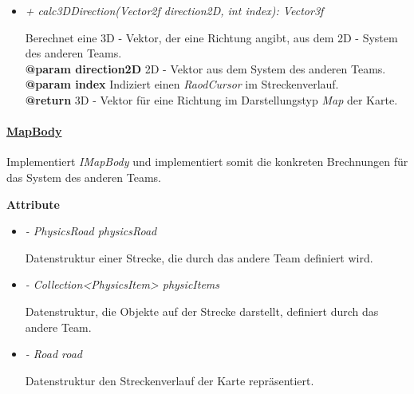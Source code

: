 \begin{itemize}
                    \item  \textit{+ calc3DDirection(Vector2f direction2D, int index): Vector3f}
                    \begin{leftbar}[0.9\linewidth]
                        Berechnet eine 3D - Vektor, der eine Richtung angibt, aus dem 2D - System des anderen Teams.\\
                        \textbf{@param direction2D} 2D - Vektor aus dem System des anderen Teams.\\
                        \textbf{@param index} Indiziert einen \textit{RaodCursor} im Streckenverlauf.\\
                        \textbf{@return} 3D - Vektor für eine Richtung im Darstellungstyp \textit{Map} der Karte.
                    \end{leftbar}    
                \end{itemize}
                
                
                
            \paragraph{\underline{MapBody}} \mbox{}\par
                Implementiert \textit{IMapBody} und implementiert somit die konkreten Brechnungen für das System des anderen Teams.
                    
                \textbf{Attribute}
                \begin{itemize}
                    \item  \textit{- PhysicsRoad physicsRoad} 
                        \begin{leftbar}[0.9\linewidth]
                            Datenstruktur einer Strecke, die durch das andere Team definiert wird.
                        \end{leftbar}
                
                    \item  \textit{- Collection<PhysicsItem> physicItems} 
                        \begin{leftbar}[0.9\linewidth]
                            Datenstruktur, die Objekte auf der Strecke darstellt, definiert durch das andere Team.
                        \end{leftbar}
                    
                    \item  \textit{- Road road} 
                        \begin{leftbar}[0.9\linewidth]
                            Datenstruktur den Streckenverlauf der Karte repräsentiert.
                        \end{leftbar}
                \end{itemize}
    
